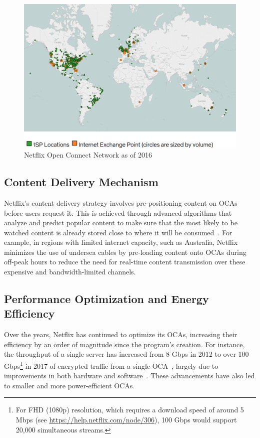 \begin{figure}[htpb]
    \centering
    \includegraphics[width=\linewidth]{images/NetflixISP.png}
    \caption[Netflix Open Connect Network as of 2016]{Netflix Open Connect Network as of 2016~\parencite{netflix_open_connect}}\label{fig:netflix-isp}
\end{figure}

\subsection{Content Delivery Mechanism}

Netflix's content delivery strategy involves pre-positioning content on \ac{OCAs} before users request it. This is achieved through advanced algorithms that analyze and predict popular content to make sure that the most likely to be watched content is already stored close to where it will be consumed~\parencite{netflix_cloud}. For example, in regions with limited internet capacity, such as Australia, Netflix minimizes the use of undersea cables by pre-loading content onto \ac{OCAs} during off-peak hours to reduce the need for real-time content transmission over these expensive and bandwidth-limited channels.

\subsection{Performance Optimization and Energy Efficiency}

Over the years, Netflix has continued to optimize its \ac{OCAs}, increasing their efficiency by an order of magnitude since the program's creation. For instance, the throughput of a single server has increased from 8 Gbps in 2012 to over 100 Gbps\footnote{For FHD (1080p) resolution, which requires a download speed of around 5 Mbps (see \url{https://help.netflix.com/node/306}), 100 Gbps would support 20,000 simultaneous streams.} in 2017 of encrypted traffic from a single OCA~\parencite{netflix_content_serving}, largely due to improvements in both hardware and software~\parencite{netflix_open_connect}. These advancements have also led to smaller and more power-efficient \ac{OCAs}.

